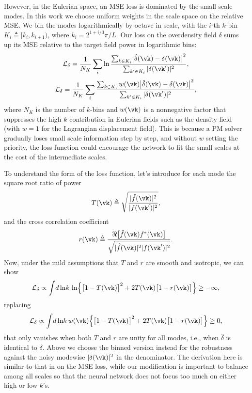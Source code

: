 \documentclass[usenatbib]{mnras}
\renewcommand{\d}{d}
\newcommand{\cL}{\mathcal{L}}
\begin{document}
However, in the Eulerian space, an MSE loss is dominated by the small
scale modes.
In this work we choose uniform weights in the scale space on the
relative MSE.
We bin the modes logarithmically by  octave in scale, with
the $i$-th $k$-bin $K_i \triangleq [k_i, k_{i+1})$, where $k_i =
2^{1+i/3} \pi / L$.
Our loss on the overdensity field $\delta$ sums up its MSE relative to
the target field power in logarithmic bins:
%
\begin{equation}
\cL_\delta = \frac1{N_K} \sum_i \ln
\frac{\sum_{k \in K_i} \bigl| \hat\delta(\vk) - \delta(\vk) \bigr|^2}
     {\sum_{k' \in K_i} |\delta(\vk')|^2},
\end{equation}
%
\begin{equation}
\cL_\delta = \frac1{N_K} \sum_i
\frac{\sum_{k \in K_i} w(\vk)
      \bigl| \hat\delta(\vk) - \delta(\vk) \bigr|^2}
     {\sum_{k' \in K_i} |\delta(\vk')|^2},
\end{equation}
%
where $N_K$ is the number of $k$-bins and $w(\vk)$ is a nonnegative
factor that suppresses the high $k$ contribution in Eulerian fields such
as the density field (with $w=1$ for the Lagrangian displacement field).
This is because a PM solver gradually loses small scale information step
by step, and without $w$ setting the priority, the loss function could
encourage the network to fit the small scales at the cost of the
intermediate scales.

To understand the form of the loss function, let's introduce for each
mode the square root ratio of power
%
\begin{equation}
T(\vk) \triangleq
\sqrt{\frac{|\hat f(\vk)|^2}{|f(\vk')|^2}},
\end{equation}
%
and the cross correlation coefficient
%
\begin{equation}
r(\vk) \triangleq
\frac{\Re \bigl[ \hat f(\vk) f^*(\vk) \bigr]}
     {\sqrt{|\hat f(\vk)|^2 |f(\vk')|^2}}.
\end{equation}
%
Now, under the mild assumptions that $T$ and $r$ are smooth and
isotropic, we can show
%
\begin{equation}
\cL_\delta \propto \int \!\d\ln\!k\, \ln
\Bigl\{ \bigl[ 1 - T(\vk) \bigr]^2
  + 2 T(\vk) \bigl[ 1 - r(\vk) \bigr] \Bigr\} \geq -\infty,
\end{equation}
%
replacing
%
\begin{equation}
\cL_\delta \propto \int \!\d\ln\!k\, w(\vk)
\Bigl\{ \bigl[ 1 - T(\vk) \bigr]^2
  + 2 T(\vk) \bigl[ 1 - r(\vk) \bigr] \Bigr\} \geq 0,
\end{equation}
%
that only vanishes when both $T$ and $r$ are unity for all modes, i.e.,
when $\hat\delta$ is identical to $\delta$.
Above we choose the binned version instead for the robustness against
the noisy modewise $|\delta(\vk)|^2$ in the denominator.
The derivation here is similar to that in \citet{HeEtAl2019} on the MSE
loss, while our modification is important to balance among all scales so
that the neural network does not focus too much on either high or low
$k$'s.
\end{document}
